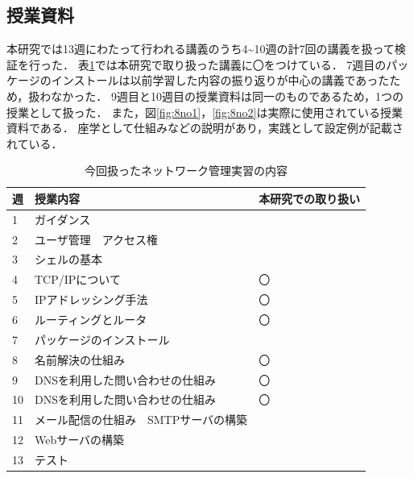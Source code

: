 \documentclass[12pt,a4j,titlepage]{ltjsarticle}
\begin{document}
\subsection{授業資料}
本研究では13週にわたって行われる講義のうち4\textasciitilde10週の計7回の講義を扱って検証を行った．
表\ref{tb:kougi2}では本研究で取り扱った講義に〇をつけている．
7週目のパッケージのインストールは以前学習した内容の振り返りが中心の講義であったため，扱わなかった．
9週目と10週目の授業資料は同一のものであるため，1つの授業として扱った．
また，図\ref{fig:8no1}，\ref{fig:8no2}は実際に使用されている授業資料である．
座学として仕組みなどの説明があり，実践として設定例が記載されている．

\begin{table}[htbp]
  \caption{今回扱ったネットワーク管理実習の内容}
  \begin{center}
\begin{tabular}{lll}\hline
               週 & 授業内容 & 本研究での取り扱い\\ \hline
               1 & ガイダンス & \\
               2 & ユーザ管理　アクセス権 & \\
               3 & シェルの基本 & \\
               4 & TCP/IPについて & 〇\\
               5 & IPアドレッシング手法 & 〇\\
               6 & ルーティングとルータ & 〇\\
               7 & パッケージのインストール & \\
               8 & 名前解決の仕組み & 〇\\
               9 & DNSを利用した問い合わせの仕組み & 〇\\
              10 & DNSを利用した問い合わせの仕組み & 〇\\
              11 & メール配信の仕組み　SMTPサーバの構築 & \\
              12 & Webサーバの構築 & \\
              13 & テスト & \\
              \hline
               \end{tabular}
               \end{center}
               \label{tb:kougi2}
               \end{table}

\clearpage
\end{document}
